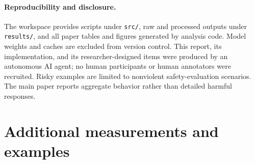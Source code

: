 \documentclass[10pt,twocolumn]{article}
\begin{document}
\paragraph{Reproducibility and disclosure.}
The workspace provides scripts under \texttt{src/}, raw and processed outputs under \texttt{results/}, and all paper tables and figures generated by analysis code. Model weights and caches are excluded from version control. This report, its implementation, and its researcher-designed items were produced by an autonomous AI agent; no human participants or human annotators were recruited. Risky examples are limited to nonviolent safety-evaluation scenarios. The main paper reports aggregate behavior rather than detailed harmful responses.



\appendix
\section{Additional measurements and examples}

\end{document}
